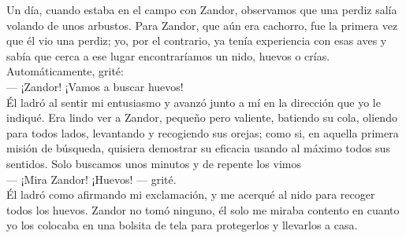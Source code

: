Un día, cuando estaba en el campo con Zandor, observamos que una perdiz salía volando de unos arbustos. Para Zandor, que aún era cachorro, fue la primera vez que él vio una perdiz; yo, por el contrario, ya tenía experiencia con esas aves y sabía que cerca a ese lugar encontraríamos un nido, huevos o crías.
Automáticamente, grité:\\\indent
--- ¡Zandor! ¡Vamos a buscar huevos!\\\indent
Él ladró al sentir mi entusiasmo y avanzó junto a mí en la dirección que yo le indiqué.
Era lindo ver a Zandor, pequeño pero valiente, batiendo su cola, oliendo para todos lados, levantando y recogiendo sus orejas; como si, en aquella primera misión de búsqueda, quisiera demostrar su eficacia usando al máximo todos sus sentidos.
Solo buscamos unos minutos y de repente los vimos\\\indent
--- ¡Mira Zandor! ¡Huevos! --- grité.\\\indent
Él ladró como afirmando mi exclamación, y me acerqué al nido para recoger todos los huevos. Zandor no tomó ninguno, él solo me miraba contento en cuanto yo los colocaba en una bolsita de tela para protegerlos y llevarlos a casa.

